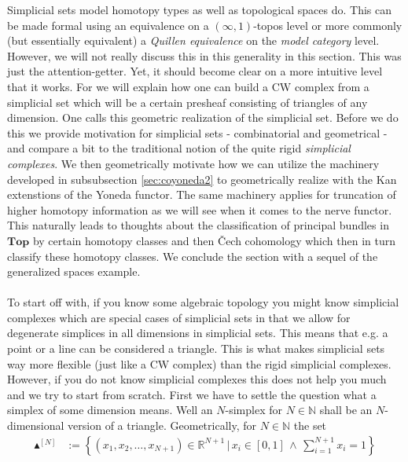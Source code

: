 Simplicial sets model homotopy types as well as topological spaces do. This can be made formal using an equivalence on a $(\infty,1)$-topos level or more commonly (but essentially equivalent) a \textit{Quillen equivalence} on the \textit{model category} level. However, we will not really discuss this in this generality in this section. This was just the attention-getter. Yet, it should become clear on a more intuitive level that it works. For we will explain how one can build a CW complex from a simplicial set which will be a certain presheaf consisting of {\glqq}triangles of any dimension{\grqq}. One calls this geometric realization of the simplicial set. Before we do this we provide motivation for simplicial sets - combinatorial and geometrical - and compare a bit to the traditional notion of the quite rigid \textit{simplicial complexes}. We then geometrically motivate how we can utilize the machinery developed in subsubsection \ref{sec:coyoneda2} to geometrically realize with the Kan extenstions of the Yoneda functor. The same machinery applies for truncation of higher homotopy information as we will see when it comes to the nerve functor. This naturally leads to thoughts about the classification of principal bundles in $\mathbf{Top}$ by certain homotopy classes and then \v{C}ech cohomology which then in turn classify these homotopy classes. We conclude the section with a sequel of the generalized spaces example.
\\\\
To start off with, if you know some algebraic topology you might know simplicial complexes which are special cases of simplicial sets in that we allow for degenerate simplices in all dimensions in simplicial sets. This means that e.g. a point or a line can be considered a triangle. This is what makes simplicial sets way more flexible (just like a CW complex) than the rigid simplicial complexes. However, if you do not know simplicial complexes this does not help you much and we try to start from scratch. First we have to settle the question what a simplex of some dimension means. Well an $N$-simplex for $N \in \mathbb{N}$ shall be an $N$-dimensional version of a triangle. Geometrically, for $N \in \mathbb{N}$ the set
\begin{align*}
  \blacktriangle^{[N]}
  &:=
  \left\lbrace
      (x_{1},x_{2},\ldots,x_{N+1})
      \in
      \mathbb{R}^{N+1}
    \,
    \vert
    \,
      x_{i}
      \in
      [0,1]
      \,
      \land
      \,
      \sum_{i=1}^{N+1}
      x_{i}
      =
      1
  \right\rbrace
\end{align*}

